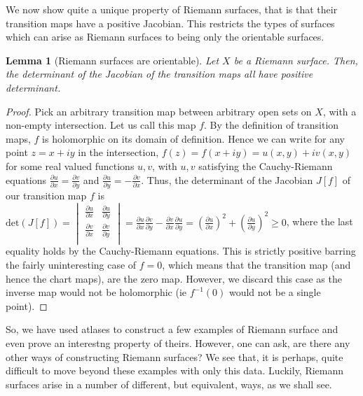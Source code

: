 \documentclass[11pt]{report}
\newtheorem{lemma}[thm]{Lemma}
\theoremstyle{definition}
\begin{document}
We now show quite a unique property of Riemann surfaces, that is that their transition maps have a positive Jacobian. This restricts the types of surfaces which can arise as Riemann surfaces to being only the orientable surfaces. 
\begin{lemma}[Riemann surfaces are orientable]
  Let $X$ be a Riemann surface. Then, the determinant of the Jacobian of the transition maps all have positive determinant.
\end{lemma}
\begin{proof}
  Pick an arbitrary transition map between arbitrary open sets on $X$, with a non-empty intersection. Let us call this map $f$. By the definition of transition maps, $f$ is holomorphic on its domain of definition. Hence we can write for any point $z=x+iy$ in the intersection, $f(z) = f(x+iy)=u(x,y)+iv(x,y)$ for some real valued functions $u,v$, with $u,v$ satisfying the Cauchy-Riemann equations $\frac{\partial u}{\partial x} = \frac{\partial v}{\partial y}$ and $\frac{\partial u}{\partial y} = -\frac{\partial v}{\partial x}$. 
  Thus, the determinant of the Jacobian $J[f]$ of our transition map $f$ is 
  $\text{det}(J[f])=\begin{vmatrix}
    \frac{\partial u}{\partial x} & \frac{\partial u}{\partial y} \\
    \frac{\partial v}{\partial x} & \frac{\partial v}{\partial y} \\
  \end{vmatrix} = \frac{\partial u}{\partial x}\frac{\partial v}{\partial y} -  \frac{\partial v}{\partial x}\frac{\partial u}{\partial y}= (\frac{\partial u}{\partial x})^2 + (\frac{\partial u}{\partial y})^2 \geq 0$, where the last equality holds by the Cauchy-Riemann equations. This is strictly positive barring the fairly uninteresting case of $f=0$, which means that the transition map (and hence the chart maps), are the zero map. However, we discard this case as the inverse map would not be holomorphic (ie $f^{-1}(0)$ would not be a single point).
\end{proof}

So, we have used atlases to construct a few examples of Riemann surface and even prove an interestng property of theirs. However, one can ask, are there any other ways of constructing Riemann surfaces? We see that, it is perhaps, quite difficult to move beyond these examples with only this data. Luckily, Riemann surfaces arise in a number of different, but equivalent, ways, as we shall see.
\end{document}
